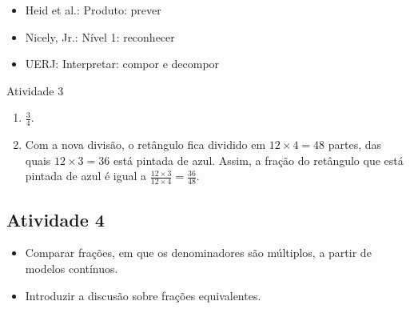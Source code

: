    \vspace{.1cm}

 \vspace{.1cm}

\begin{itemize} %
    \item       Heid et al.: Produto: prever
    \item       Nicely, Jr.: Nível 1: reconhecer
    \item       UERJ: Interpretar: compor e decompor
\end{itemize} %

\begin{resposta*}{Atividade 3}
\begin{enumerate} [\quad a)] %
    \item             $\frac{3}{4}$.
    \item       Com a nova divisão, o retângulo fica dividido em       $12
\times 4 = 48$       partes, das quais       $12 \times 3 = 36$       está
pintada de azul. Assim, a fração do retângulo que está pintada de azul é igual a
      $\frac{12 \times 3}{12 \times 4} = \frac{36}{48}$.
\end{enumerate} %

\end{resposta*}

\newpage

\subsection{Atividade 4}

\begin{itemize} %
    \item       Comparar frações, em que os denominadores são múltiplos, a
partir de modelos contínuos.
    \item       Introduzir a discusão sobre frações equivalentes.
\end{itemize} %
\vspace{.15cm}


